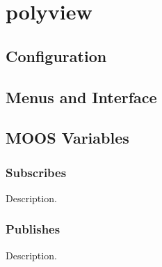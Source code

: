 \section{polyview}
\label{polyview}

\subsection{Configuration}

\subsection{Menus and Interface}

\subsection{MOOS Variables}
\subsubsection{Subscribes}
\begin{hangpar}{\pin}{}
Description.
\end{hangpar}
\subsubsection{Publishes}
\begin{hangpar}{\pin}{}
Description.
\end{hangpar}
